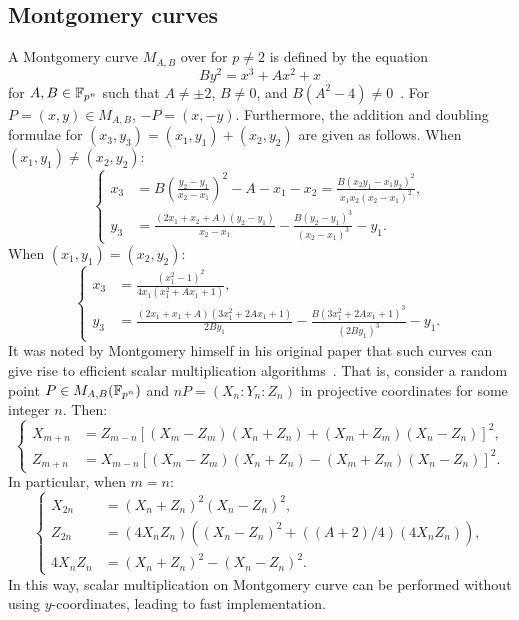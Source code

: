 %
%

\subsection{Montgomery curves}
\label{sec:montgomery-symmetry}
%
A Montgomery curve $M_{A,B}$ over  for $p\neq 2$ is defined by
the equation \begin{equation}
  By^2=x^3+Ax^2+x \label{eq:montgomery-curve} \end{equation} for
$A,B\in\mathbb F_{p^n}$ such that $A\neq\pm 2$, $B\neq 0$, and
$B(A^2-4)\neq 0$~\cite{1987-montgomery}.
%
For $P=(x,y)\in M_{A,B}$, $-P=(x,-y)$.
%
Furthermore, the addition and doubling formulae for
$(x_3,y_3)=(x_1,y_1)+(x_2,y_2)$ are given as follows.
%
When $(x_1,y_1)\neq(x_2,y_2)$: \[ \left\{\begin{aligned}
      x_3 & = B\left(\frac{y_2 - y_1} {x_2 - x_1}\right)^2 - A - x_1 - x_2 = \frac{B(x_2y_1 - x_1y_2)^2} {x_1x_2(x_2 - x_1)^2}, \\
      y_3 & = \frac{(2x_1 + x_2 + A)(y_2 - y_1)} {x_2 - x_1} -
      \frac{B(y_2 - y_1)^3} {(x_2 - x_1)^3} - y_1.
    \end{aligned}\right. \]
%
When $(x_1,y_1)=(x_2,y_2)$: \[ \left\{\begin{aligned}
      x_3 & = \frac{(x_1^2 - 1)^2} {4x_1(x_1^2 + Ax_1 + 1)},  \\
      y_3 & = \frac{(2x_1 + x_1 + A)(3x_1^2 + 2Ax_1 + 1)} {2By_1} -
      \frac{B(3x_1^2 + 2Ax_1 + 1)^3} {(2By_1)^3} - y_1.
  \end{aligned}\right. \]
%
It was noted by Montgomery himself in his original paper that such
curves can give rise to efficient scalar multiplication
algorithms~\cite{1987-montgomery}.
%
That is, consider a random point $P\in M_{A,B}(\mathbb F_{p^n})$ and
$nP=(X_n:Y_n:Z_n)$ in projective coordinates for some integer $n$.
%
Then:
%
\[ \left\{\begin{aligned}
      X_{m+n} & = Z_{m-n}[(X_m - Z_m)(X_n + Z_n) + (X_m + Z_m)(X_n - Z_n)]^2, \\
      Z_{m+n} & = X_{m-n}[(X_m - Z_m)(X_n + Z_n) - (X_m + Z_m)(X_n -
      Z_n)]^2.
    \end{aligned}\right. \]
%
In particular, when $m=n$:
\[ \left\{\begin{aligned}
      X_{2n} & = (X_n + Z_n)^2(X_n - Z_n)^2, \\
      Z_{2n} & = (4X_nZ_n)\left((X_n - Z_n)^2 + ((A+2)/4)(4X_nZ_n)\right), \\
      4X_nZ_n & = ( X_n + Z_n)^2 - (X_n - Z_n)^2.
    \end{aligned}\right. \]
%
In this way, scalar multiplication on Montgomery curve can be
performed without using $y$-coordinates, leading to fast
implementation.


